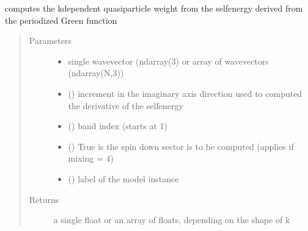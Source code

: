 \documentclass[letterpaper,10pt,english]{sphinxmanual}
\begin{document}
\begin{fulllineitems}
\label{\detokenize{functions:pyqcm.QP_weight}}
\sphinxAtStartPar
computes the k\sphinxhyphen{}dependent quasi\sphinxhyphen{}particle weight from the self\sphinxhyphen{}energy derived from the periodized Green function
\begin{quote}\begin{description}
\item[{Parameters}] \leavevmode\begin{itemize}
\item {} 
\sphinxAtStartPar
{} \textendash{} single wavevector (ndarray(3) or array of wavevectors (ndarray(N,3))

\item {} 
\sphinxAtStartPar
{} () \textendash{} increment in the imaginary axis direction used to computed the derivative of the self\sphinxhyphen{}energy

\item {} 
\sphinxAtStartPar
{} () \textendash{} band index (starts at 1)

\item {} 
\sphinxAtStartPar
{} () \textendash{} True is the spin down sector is to be computed (applies if mixing = 4)

\item {} 
\sphinxAtStartPar
{} () \textendash{} label of the model instance

\end{itemize}

\item[{Returns}] \leavevmode
\sphinxAtStartPar
a single float or an array of floats, depending on the shape of k

\end{description}\end{quote}

\end{fulllineitems}
\end{document}
